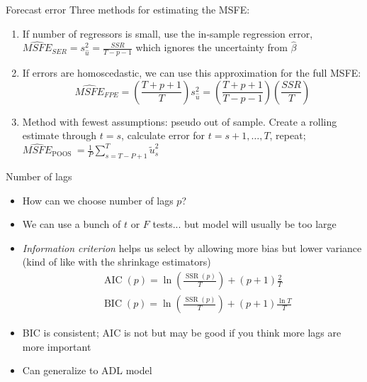 \documentclass[aspectratio=169]{beamer}
\begin{document}
\begin{frame}{Forecast error}
    Three methods for estimating the MSFE:
       \begin{enumerate}
            \item If number of regressors is small, use the in-sample regression error, $\widehat{M S F E}_{S E R}=s_{\hat{u}}^2=\frac{S S R}{T-p-1}$ which ignores the uncertainty from $\hat{\beta}$ 
            \item If errors are homoscedastic, we can use this approximation for the full MSFE:
            $$
            \widehat{M S F E}_{F P E}=\left(\frac{T+p+1}{T}\right) s_{\hat{u}}^2=\left(\frac{T+p+1}{T-p-1}\right)\left(\frac{S S R}{T}\right)
            $$
            \item Method with fewest assumptions: pseudo out of sample. Create a rolling estimate through $t=s$, calculate error for $t=s+1,\dots,T$, repeat; $\widehat{M S F E}_{\text {POOS }}=\frac{1}{P} \sum_{s=T-P+1}^T \tilde{u}_s^2$
       \end{enumerate}
\end{frame}

\begin{frame}{Number of lags}
    \begin{itemize}
       \item How can we choose number of lags $p$?
       \item We can use a bunch of $t$ or $F$ tests... but model will usually be too large
       \item \textit{Information criterion} helps us select by allowing more bias but lower variance (kind of like with the shrinkage estimators)
       $$
       \begin{aligned}
        & \operatorname{AIC}(p)=\ln \left(\frac{\operatorname{SSR}(p)}{T}\right)+(p+1) \frac{2}{T} \\
        & \operatorname{BIC}(p)=\ln \left(\frac{\operatorname{SSR}(p)}{T}\right)+(p+1) \frac{\ln T}{T}
        \end{aligned}
       $$
       \item BIC is consistent; AIC is not but may be good if you think more lags are more important
       \item Can generalize to ADL model
    \end{itemize}
\end{frame}
\end{document}
